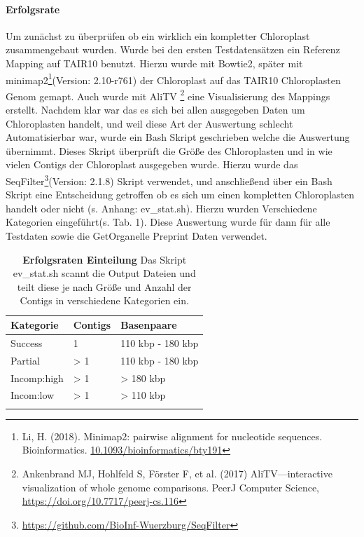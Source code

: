 \documentclass{scrartcl}
\begin{document}
\paragraph{Erfolgsrate}
\label{sec-3-1-2-2}
Um zunächst zu überprüfen ob ein wirklich ein kompletter Chloroplast zusammengebaut wurden. Wurde bei den ersten Testdatensätzen ein Referenz Mapping auf
TAIR10 benutzt. Hierzu wurde mit Bowtie2, später mit minimap2\footnote{Li, H. (2018). Minimap2: pairwise alignment for nucleotide sequences. Bioinformatics. \url{10.1093/bioinformatics/bty191}}(Version: 2.10-r761)  der Chloroplast auf das TAIR10 Chloroplasten Genom gemapt. Auch wurde mit AliTV \footnote{Ankenbrand MJ, Hohlfeld S, Förster F, et al. (2017) AliTV—interactive visualization of whole genome comparisons. PeerJ Computer Science, \url{https://doi.org/10.7717/peerj-cs.116}} 
eine Visualisierung des Mappings erstellt. Nachdem klar war das es sich bei allen ausgegeben Daten um Chloroplasten handelt, und weil diese Art der 
Auswertung schlecht Automatisierbar war, wurde ein Bash Skript geschrieben welche die Auswertung übernimmt. Dieses Skript überprüft die Größe des
Chloroplasten und in wie vielen Contigs der Chloroplast ausgegeben wurde. Hierzu wurde das SeqFilter\footnote{\url{https://github.com/BioInf-Wuerzburg/SeqFilter}}(Version: 2.1.8) Skript verwendet, und anschließend über ein Bash
Skript eine Entscheidung getroffen ob es sich um einen kompletten Chloroplasten handelt oder nicht (s. Anhang: ev\_stat.sh). Hierzu wurden Verschiedene
Kategorien eingeführt(s. Tab. 1). Diese Auswertung wurde für dann für alle Testdaten sowie die GetOrganelle Preprint Daten verwendet.
\begin{table}[!h]
\caption[Erfolgsraten Einteilung]{\textbf{Erfolgsraten Einteilung} Das Skript ev\_stat.sh scannt die Output Dateien und teilt diese je nach Größe und Anzahl der Contigs in verschiedene Kategorien ein. }
\begin{center}
\begin{tabular}{lll}
Kategorie & Contigs & Basenpaare\\
\hline
Success & 1 & 110 kbp - 180 kbp\\
Partial & > 1 & 110 kbp - 180 kbp\\
Incomp:high & > 1 & > 180 kbp\\
Incom:low & > 1 & > 110 kbp\\
 &  & \\
\end{tabular}
\end{center}
\end{table}
\end{document}
